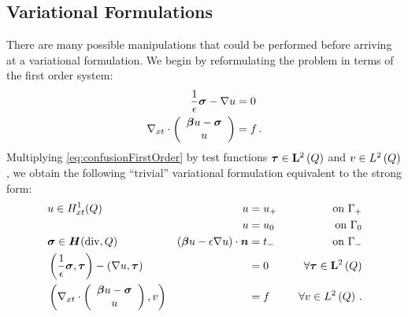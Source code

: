 \documentclass[Dissertation.tex]{subfiles}
\begin{document}
\subsection{Variational Formulations}
There are many possible manipulations that could be performed before arriving at a variational formulation. 
We begin by reformulating the problem in terms of the first order system:
\begin{equation}
\label{eq:confusionFirstOrder}
\begin{aligned}
\frac{1}{\epsilon}\boldsymbol\sigma-\nabla u&=0\\
\nabla_{xt}\cdot\left( \begin{array}{c} \boldsymbol\beta u-\boldsymbol\sigma\\ u\\ \end{array} \right)&=f\,.
\end{aligned}
\end{equation}
Multiplying \eqref{eq:confusionFirstOrder} by test functions $\boldsymbol\tau\in\mathbf{L}^2\left( Q \right)$ and $v\in L^2\left( Q \right)$, we obtain the following 
``trivial'' variational formulation equivalent to the strong form:
\begin{equation}
\label{eq:confusionStrongBF}
	\begin{aligned}
		&u\in H^1_{xt}(Q) &u&=u_+\quad &\text{on }\Gamma_+\\
		& &u&=u_0\quad &\text{on }\Gamma_0\\
		&\boldsymbol\sigma\in \mbox{\boldmath $H$}(\text{div},Q)&(\boldsymbol\beta u-\epsilon\nabla u)\cdot\boldsymbol n&=t_-\quad &\text{on }\Gamma_-\\
		&\left( \frac{1}{\epsilon}\boldsymbol\sigma,\boldsymbol\tau \right)-\left( \nabla u,\boldsymbol\tau \right)&&=0\quad&\forall\boldsymbol\tau\in\mathbf{L}^2\left( Q \right)\\
		&\left( \nabla_{xt}\cdot\left( \begin{array}{c} \boldsymbol\beta u-\boldsymbol\sigma\\ u\\ \end{array} \right),v \right)&&=f\quad&\forall v\in L^2\left( Q \right)\,.
	\end{aligned}
\end{equation}
\end{document}
